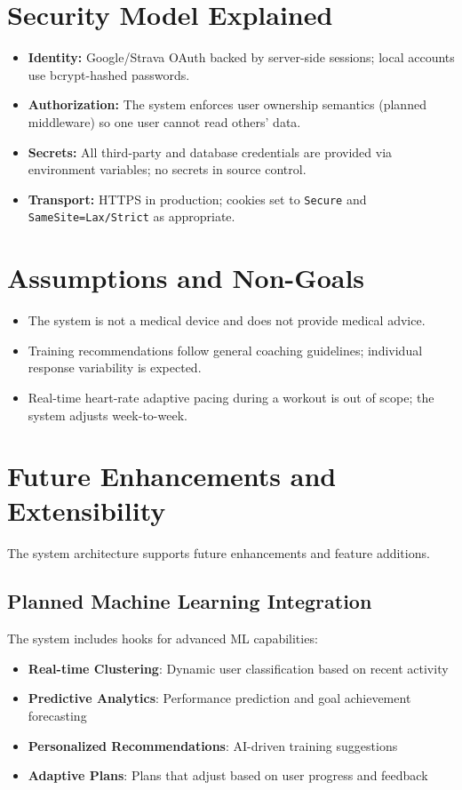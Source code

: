 \section{Security Model Explained}
\begin{itemize}
  \item \textbf{Identity:} Google/Strava OAuth backed by server-side sessions; local accounts use bcrypt-hashed passwords.
  \item \textbf{Authorization:} The system enforces user ownership semantics (planned middleware) so one user cannot read others’ data.
  \item \textbf{Secrets:} All third-party and database credentials are provided via environment variables; no secrets in source control.
  \item \textbf{Transport:} HTTPS in production; cookies set to \texttt{Secure} and \texttt{SameSite=Lax/Strict} as appropriate.
\end{itemize}

\section{Assumptions and Non-Goals}
\begin{itemize}
  \item The system is not a medical device and does not provide medical advice.
  \item Training recommendations follow general coaching guidelines; individual response variability is expected.
  \item Real-time heart-rate adaptive pacing during a workout is out of scope; the system adjusts week-to-week.
\end{itemize}

\section{Future Enhancements and Extensibility}

The system architecture supports future enhancements and feature additions.

\subsection{Planned Machine Learning Integration}

The system includes hooks for advanced ML capabilities:

\begin{itemize}
    \item \textbf{Real-time Clustering}: Dynamic user classification based on recent activity
    \item \textbf{Predictive Analytics}: Performance prediction and goal achievement forecasting
    \item \textbf{Personalized Recommendations}: AI-driven training suggestions
    \item \textbf{Adaptive Plans}: Plans that adjust based on user progress and feedback
\end{itemize}

